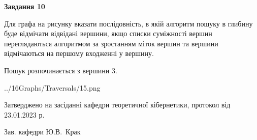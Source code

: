\documentclass[12pt, ukrainian]{article}
\begin{document}
{\begin {large}
{\begin {center}\textbf{Завдання 10}\end {center}}\par
Для графа на рисунку вказати послідовність, в якій алгоритм пошуку в глибину буде відмічати відвідані вершини, якщо списки суміжності вершин переглядаються алгоритмом за зростанням міток вершин та вершини відмічаються на першому вход\-женні у вершину.\par
Пошук розпочинається з вершини 3.\par

\begin{center}
	{../16Graphs/Traversals/15.png}
\end{center}\par
\newpage


\end {large}
}
{\smallskip \begin {small} Затверджено на засіданні кафедри теоретичної кібернетики, протокол  від   23.01.2023 р.\par\smallskip\smallskip
{\parbox {6.5 cm}{Зав. кафедри \dotfill Ю.В.~Крак}} \end{small}}
\end{document}
